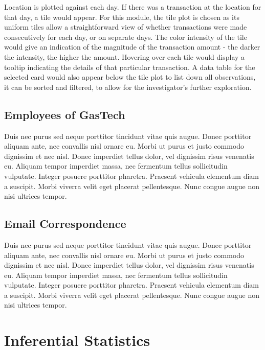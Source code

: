 \documentclass{acm_proc_article-sp}
\begin{document}
Location is plotted against each day. If there was a transaction at the
location for that day, a tile would appear. For this module, the tile
plot is chosen as its uniform tiles allow a straightforward view of
whether transactions were made consecutively for each day, or on
separate days. The color intensity of the tile would give an indication
of the magnitude of the transaction amount - the darker the intensity,
the higher the amount. Hovering over each tile would display a tooltip
indicating the details of that particular transaction. A data table for
the selected card would also appear below the tile plot to list down all
observations, it can be sorted and filtered, to allow for the
investigator's further exploration.

\hypertarget{employees-of-gastech}{%
\subsection{Employees of GasTech}\label{employees-of-gastech}}

Duis nec purus sed neque porttitor tincidunt vitae quis augue. Donec
porttitor aliquam ante, nec convallis nisl ornare eu. Morbi ut purus et
justo commodo dignissim et nec nisl. Donec imperdiet tellus dolor, vel
dignissim risus venenatis eu. Aliquam tempor imperdiet massa, nec
fermentum tellus sollicitudin vulputate. Integer posuere porttitor
pharetra. Praesent vehicula elementum diam a suscipit. Morbi viverra
velit eget placerat pellentesque. Nunc congue augue non nisi ultrices
tempor.

\hypertarget{email-correspondence}{%
\subsection{Email Correspondence}\label{email-correspondence}}

Duis nec purus sed neque porttitor tincidunt vitae quis augue. Donec
porttitor aliquam ante, nec convallis nisl ornare eu. Morbi ut purus et
justo commodo dignissim et nec nisl. Donec imperdiet tellus dolor, vel
dignissim risus venenatis eu. Aliquam tempor imperdiet massa, nec
fermentum tellus sollicitudin vulputate. Integer posuere porttitor
pharetra. Praesent vehicula elementum diam a suscipit. Morbi viverra
velit eget placerat pellentesque. Nunc congue augue non nisi ultrices
tempor.

\hypertarget{inferential-statistics}{%
\section{Inferential Statistics}\label{inferential-statistics}}
\end{document}

